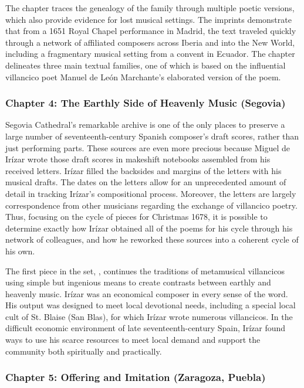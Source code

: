 \documentclass{vcbook-proposal}
\begin{document}
The chapter traces the genealogy of the  family 
through multiple poetic versions, which also provide evidence for lost musical 
settings.
The imprints demonstrate that from a 1651 Royal Chapel performance in Madrid, 
the text traveled quickly through a network of affiliated composers across 
Iberia and into the New World, including a fragmentary musical setting from a 
convent in Ecuador.
The chapter delineates three main textual families, one of which is based on 
the influential villancico poet Manuel de León Marchante's elaborated version 
of the poem. 

\subsubsection{Chapter 4: The Earthly Side of Heavenly Music (Segovia)}

Segovia Cathedral's remarkable archive is one of the only places to preserve a 
large number of seventeenth-century Spanish composer's draft scores, rather 
than just performing parts.
These sources are even more precious because Miguel de Irízar wrote those draft 
scores in makeshift notebooks assembled from his received letters.
Irízar filled the backsides and margins of the letters with his musical drafts.
The dates on the letters allow for an unprecedented amount of detail in 
tracking Irízar's compositional process.
Moreover, the letters are largely correspondence from other musicians regarding 
the exchange of villancico poetry.
Thus, focusing on the cycle of pieces for Christmas 1678, it is possible to 
determine exactly how Irízar obtained all of the poems for his cycle through 
his network of colleagues, and how he reworked these sources into a coherent 
cycle of his own.

The first piece in the set, , continues the 
traditions of metamusical villancicos using simple but ingenious means to 
create contrasts between earthly and heavenly music.
Irízar was an economical composer in every sense of the word.
His output was designed to meet local devotional needs, including a special 
local cult of St. Blaise (San Blas), for which Irízar wrote numerous 
villancicos. 
In the difficult economic environment of late seventeenth-century Spain, Irízar 
found ways to use his scarce resources to meet local demand and support the 
community both spiritually and practically.

\subsubsection{Chapter 5: Offering and Imitation (Zaragoza, Puebla)}
\end{document}
